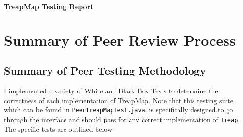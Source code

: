\documentclass[11pt]{article}
\def\tt{\texttt}
\begin{document}
\begin{center}
    \huge\textbf{TreapMap Testing Report}
\end{center}

\section{Summary of Peer Review Process}

\subsection{Summary of Peer Testing Methodology}
I implemented a variety of White and Black Box Tests to determine the correctness of each implementation of TreapMap. Note that this testing suite which can be found in \tt{PeerTreapMapTest.java}, is specifically designed to go through the interface and should pass for any correct implementation of \tt{Treap}. The specific tests are outlined below.
\end{document}
